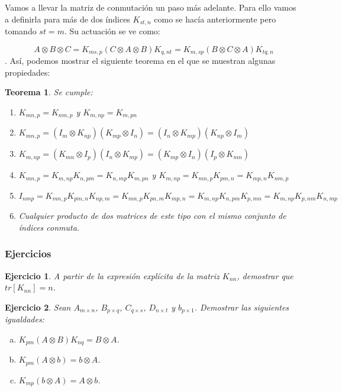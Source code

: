 \documentclass{article}
\theoremstyle{theorem-style}  %
\newtheorem{theorem}{Teorema}[section]  %
\theoremstyle{definition-style}
\theoremstyle{example-style}
\theoremstyle{exercise-style}
\newtheorem{exercise}{Ejercicio}[section]
\begin{document}
	Vamos a llevar la matriz de conmutación un paso más adelante. Para ello vamos a definirla para más de dos índices
	$K_{st,n}$ como se hacía anteriormente pero tomando $st=m$. Su actuación se ve como:
	
	$$ A \otimes B \otimes C = K_{ms,p}(C \otimes A \otimes B)K_{q,nt} = K_{m,sp}(B \otimes C \otimes A)K_{tq,n}$$. Así, podemos mostrar el siguiente teorema en el que se muestran algunas propiedades:
	
	\begin{theorem} Se cumple:\\
		\begin{enumerate}
			\item  $K_{mn,p}=K_{nm,p}$ y $K_{m,np} = K_{m,pn} $ 
			
			\item $K_{mn,p}=(I_m \otimes K_{np})(K_{mp} \otimes I_n)=(I_n \otimes K_{mp})(K_{np} \otimes I_m)$
			
			\item $K_{m,np}=(K_{mn} \otimes I_p)(I_n \otimes K_{mp})=(K_{mp} \otimes I_n)(I_p \otimes K_{mn})$
			
			\item $K_{mn,p}= K_{m,np}K_{n,pm} = K_{n,mp}K_{m,pn}$ y $K_{m,np}= K_{mn,p}K_{pm,n} = K_{mp,n}K_{nm,p}$
			
			\item $I_{nmp}= K_{mn,p}K_{pm,n}K_{np,m}= K_{mn,p}K_{pn,m}K_{mp,n}=K_{m,np}K_{n,pm}K_{p,mn}=K_{m,np}K_{p,nm}K_{n,mp}$
			
			\item Cualquier producto de dos matrices de este tipo con el mismo conjunto de índices conmuta.
		\end{enumerate}	
	\end{theorem}
	
	\subsubsection{Ejercicios}
	
	\begin{exercise}
		A partir de la expresión explícita de la matriz $K_{nn}$, demostrar que $tr[K_{nn}] = n$.
	\end{exercise}
	
	\begin{exercise}
		Sean $A_{m\times n}$, $B_{p\times q}$, $C_{q\times s}$, $D_{n\times t}$ y $b_{p\times 1}$. Demostrar las siguientes igualdades:
		\begin{enumerate}[a)]
			\item $K_{pm}(A \otimes B)K_{nq} = B\otimes A$.
			\item $K_{pm}(A \otimes b) = b\otimes A$.
			\item $K_{mp}(b \otimes A) = A\otimes b$.
		\end{enumerate}
	\end{exercise}
	
\end{document}
